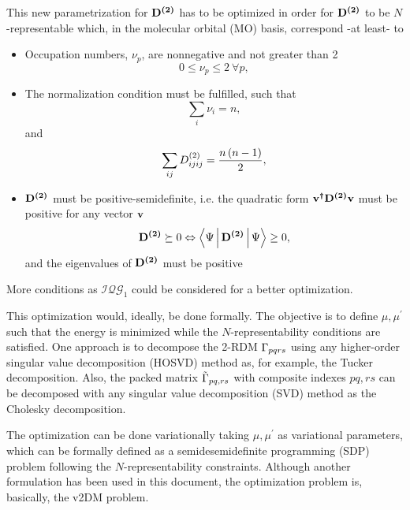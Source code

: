 This new parametrization for $\boldsymbol{\mathrm{D^{\left( 2 \right)}}}$ has to be optimized in order for
$\boldsymbol{\mathrm{D^{\left( 2 \right)}}}$ to be $N$-representable which, in the molecular
orbital (MO) basis, correspond -at least- to
\begin{itemize}
    \item Occupation numbers, $\nu_p$, are nonnegative and not greater than 2 
        \begin{equation}
            0 \le \nu_p \le 2\ \forall p,
        \end{equation}

    \item The normalization condition must be fulfilled, such that 
        \begin{equation} \label{eq:MO-norm-cond-1}
            \sum_{i} \nu_i = n,
        \end{equation}
        and 
        \begin{equation} \label{ec:normalization-condition-2RDM}
            \sum_{ij} D^{\left( 2 \right)}_{ijij} = \frac{n\left( n-1 \right)}{2}, 
        \end{equation}

    \item $\boldsymbol{\mathrm{D^{\left( 2 \right)}}}$ must be positive-semidefinite, i.e. the quadratic form
        $\boldsymbol{\mathrm{v^{\dagger} D^{\left( 2 \right)} v}}$ must be positive for any vector $\boldsymbol{\mathrm{v}}$
        \begin{equation}
            \mat{\tedm} \succeq 0 \Leftrightarrow \Braket{\Psi | \mat{\tedm} | \Psi} \ge 0,
        \end{equation}
        and the eigenvalues of $\boldsymbol{\mathrm{D^{\left( 2 \right)}}}$ must be positive

\end{itemize}
More conditions as $\mathcal{I} \mathcal{Q} \mathcal{G}_1$ could be
considered for a better optimization.

This optimization would, ideally, be done formally.
The objective is to define $\mu, \mu^{\prime}$ such that the energy is minimized
while the $N$-representability conditions are satisfied.
One approach is to decompose the 2-RDM $\Gamma_{pqrs}$ using any higher-order
singular value decomposition (HOSVD) method as, for example,
the Tucker decomposition.
Also, the packed matrix $\tilde{\Gamma}_{pq,rs}$ with composite indexes $pq, rs$
can be decomposed with any singular value decomposition (SVD) method as the Cholesky
decomposition.

The optimization can be done variationally taking $\mu,\mu^{\prime}$ as variational
parameters, which can be formally defined as a semidesemidefinite
programming (SDP) problem following the $N$-representability 
constraints.
Although another formulation has been used in this document, the optimization
problem is, basically, the v2DM problem.

